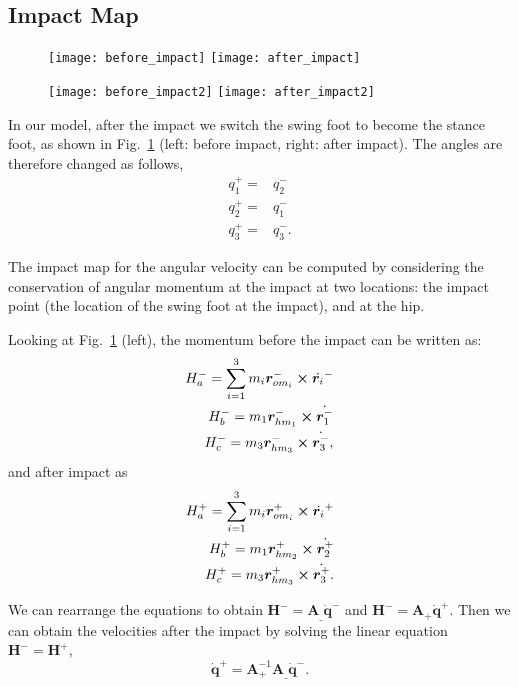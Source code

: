 \subsection{Impact Map}
\label{sec:impact}

\begin{figure}[h!]
\centering
\texttt{[image: before\_impact]}
\hspace{0.5cm}
\texttt{[image: after\_impact]}
\label{fig:impact}
\end{figure}


\begin{figure}[h!]
\centering
\texttt{[image: before\_impact2]}
\hspace{0.5cm}
\texttt{[image: after\_impact2]}
\label{fig:impact2}
\end{figure}


In our model, after the impact we switch the swing foot to become the stance foot, as shown in Fig.~\ref{fig:impact} (left: before impact, right: after impact). The angles are therefore changed as follows,
\begin{align}
q_1^+ = & q_2^- \\
q_2^+ = & q_1^- \\
q_3^+ = & q_3^-.
\end{align}

The impact map for the angular velocity can be computed by considering the conservation of angular momentum at the impact at two locations: the impact point (the location of the swing foot at the impact), and at the hip. 

Looking at Fig.~\ref{fig:impact} (left), the momentum before the impact can be written as:
\begin{align}
H_a^- = \sum_{i=1}^{3} m_i \bm{r}_{{om}_i}^{-} \cross \dot{\bm{r}_i}^{-} \\
H_b^- = m_1 \bm{r}_{hm_1}^- \cross \dot{\bm{r}_1^-} \\
H_c^- = m_3 \bm{r}_{hm_3}^- \cross \dot{\bm{r}_3^-},
\end{align}
and after impact as
\begin{align}
H_a^+ = \sum_{i=1}^{3} m_i \bm{r}_{{om}_i}^{+} \cross \dot{\bm{r}_i}^{+} \\ 
H_b^+ = m_1 \bm{r}_{hm_2}^+ \cross \dot{\bm{r}_2^+} \\
H_c^+ = m_3 \bm{r}_{hm_3}^+ \cross \dot{\bm{r}_3^+}.
\end{align}

We can rearrange the equations to obtain $\bm{H}^- = \bm{A}_{\_} \dot{\bm{q}}^-$ and $\bm{H}^- = \bm{A}_{+} \dot{\bm{q}}^+$. Then we can obtain the velocities after the impact by solving the linear equation $\bm{H}^- = \bm{H}^+$, 
\begin{equation}
\dot{\bm{q}}^+ = \bm{A}_{+}^{-1} \bm{A}_{\_}  \dot{\bm{q}}^-. 
\end{equation}

